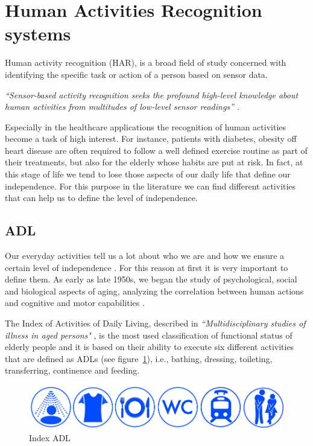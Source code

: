 \documentclass{thesisreport}
\begin{document}
\section{Human Activities Recognition systems}
Human activity recognition (HAR), is a broad field of study concerned with identifying the specific task or action of a person based on sensor data.

\emph{“Sensor-based activity recognition seeks the profound high-level knowledge about human activities from multitudes of low-level sensor readings” \cite{wang2018deep}}. 

Especially in the healthcare applications the recognition of human activities become a task of high interest. For instance, patients with diabetes, obesity off heart disease are often required to follow a well defined exercise routine as part of their treatments, but also for the elderly whose habits are put at risk. In fact, at this stage of life we tend to lose those aspects of our daily life that define our independence. For this purpose in the literature we can find different activities that can help us to define the level of independence.

\subsection{ADL}
Our everyday activities tell us a lot about who we are and how we ensure a certain level of independence \cite{buoncompagni2017towards}. For this reason at first it is very important to define them. As early as late 1950s, we began the study of psychological, social and biological aspects of aging, analyzing the correlation between human actions and cognitive and motor capabilities \cite{buoncompagni2017towards}. 

The Index of Activities of Daily Living, described in \textit{``Multidisciplinary studies of illness in aged persons"} \cite{Multidisciplinary},  is the most used classification of functional status of elderly people and it is based on their ability to execute six different activities that are defined as ADLs (see figure~\ref{fig:indexADL}), i.e., bathing, dressing, toileting, transferring, continence and feeding.

\begin{figure}[h]
	\centering
	\includegraphics[width=17cm]{Thesis/data/IndexADL.png}
	\caption{Index ADL}
	\label{fig:indexADL}
\end{figure}
\end{document}
